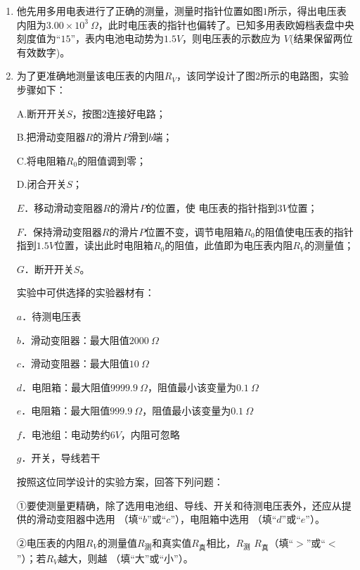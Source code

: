 \begin{enumerate}[leftmargin=0em]
\begin{enumerate}
\renewcommand{\labelenumi}{\arabic{enumi}.}
\item
他先用多用电表进行了正确的测量，测量时指针位置如图$ 1 $所示，得出电压表内阻为$ 3.00 \times 10^3 \ \Omega $，此时电压表的指针也偏转了。已知多用表欧姆档表盘中央刻度值为“$ 15 $”，表内电池电动势为$ 1.5V $，则电压表的示数应为  $ V $(结果保留两位有效数字)。

\item 
为了更准确地测量该电压表的内阻$ R_V $，该同学设计了图$ 2 $所示的电路图，实验步骤如下：

A.断开开关$ S $，按图$ 2 $连接好电路；

B.把滑动变阻器$ R $的滑片$ P $滑到$ b $端；

C.将电阻箱$ R_{0} $的阻值调到零；

D.闭合开关$ S $；

$ E $．移动滑动变阻器$ R $的滑片$ P $的位置，使
电压表的指针指到$ 3V $位置；

$ F $．保持滑动变阻器$ R $的滑片$ P $位置不变，调节电阻箱$ R_{0} $的阻值使电压表的指针指到$ 1.5V $位置，读出此时电阻箱$ R_{0} $的阻值，此值即为电压表内阻$ R_V $的测量值；

$ G $．断开开关$ S $。

实验中可供选择的实验器材有：

$ a $．待测电压表

$ b $．滑动变阻器：最大阻值$ 2000 \ \Omega $

$ c $．滑动变阻器：最大阻值$ 10 \ \Omega $

$ d $．电阻箱：最大阻值$ 9999.9 \ \Omega $，阻值最小该变量为$ 0.1 \ \Omega $

$ e $．电阻箱：最大阻值$ 999.9 \ \Omega $，阻值最小该变量为$ 0.1 \ \Omega $

$ f $．电池组：电动势约$ 6V $，内阻可忽略

$ g $．开关，导线若干

按照这位同学设计的实验方案，回答下列问题：

①要使测量更精确，除了选用电池组、导线、开关和待测电压表外，还应从提供的滑动变阻器中选用  （填“$ b $”或“$ c $”），电阻箱中选用  （填“$ d $”或“$ e $”）。

②电压表的内阻$ R_V $的测量值$ R_{ \text{测} } $和真实值$ R_{ \text{真} } $相比，$ R_{ \text{测} } $ \tk{$ > $} $ R_{ \text{真} } $（填“$ > $”或“$ < $”）；若$ R_V $越大，则越  （填“大”或“小”）。




\end{enumerate}











\end{enumerate}

